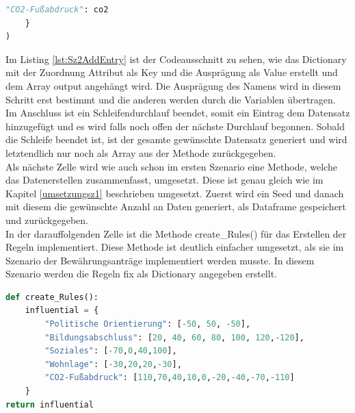 \begin{onehalfspace}
\begin{lstlisting}[language=Python,label={lst:Sz2AddEntry},caption=Codeausschnitt zum Hinzufügen eines Dateneintrags zum gesamt Datenset]
        "CO2-Fußabdruck": co2
    }  
)
\end{lstlisting}
Im Listing \ref{lst:Sz2AddEntry} ist der Codeausschnitt zu sehen, wie das Dictionary mit der Zuordnung Attribut als Key und die Ausprägung als Value erstellt und dem Array \glqq{}output\grqq{} angehängt wird. Die Ausprägung des Namens wird in diesem Schritt erst bestimmt und die anderen werden durch die Variablen übertragen.
Im Anschluss ist ein Schleifendurchlauf beendet, somit ein Eintrag dem Datensatz hinzugefügt und es wird falls noch offen der nächste Durchlauf begonnen. Sobald die Schleife beendet ist, ist der gesamte gewünschte Datensatz generiert und wird letztendlich nur noch als Array aus der Methode zurückgegeben. \\
Als nächste Zelle wird wie auch schon im ersten Szenario eine Methode, welche das Datenerstellen zusammenfasst, umgesetzt. Diese ist genau gleich wie im Kapitel \ref{umsetzungsz1} beschrieben umgesetzt. Zuerst wird ein Seed und danach mit diesem die gewünschte Anzahl an Daten generiert, als Dataframe gespeichert und zurückgegeben.\\ 
In der darauffolgenden Zelle ist die Methode \glqq{}create\_Rules()\grqq{} für das Erstellen der Regeln implementiert. Diese Methode ist deutlich einfacher umgesetzt, als sie im Szenario der Bewährungsanträge implementiert werden musste. In diesem Szenario werden die Regeln fix als Dictionary angegeben erstellt.
\begin{lstlisting}[language=Python,label={lst:Sz2Regeln},caption=Codeausschnitt zum Erstellen des Regel Dictionary]
def create_Rules():
    influential = {
        "Politische Orientierung": [-50, 50, -50],
        "Bildungsabschluss": [20, 40, 60, 80, 100, 120,-120],
        "Soziales": [-70,0,40,100],
        "Wohnlage": [-30,20,20,-30],
        "CO2-Fußabdruck": [110,70,40,10,0,-20,-40,-70,-110]
    }
return influential
\end{lstlisting}

\end{onehalfspace}

